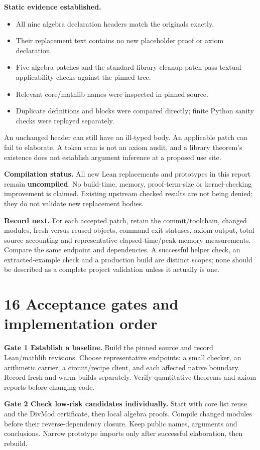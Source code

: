 \documentclass[11pt,letterpaper]{article}
\newcommand{\pageheading}[1]{\newpage\section*{#1}}
\begin{document}
\textbf{Static evidence established.}
\begin{itemize}
\item All nine algebra declaration headers match the originals exactly.
\item Their replacement text contains no new placeholder proof or axiom declaration.
\item Five algebra patches and the standard-library cleanup patch pass textual applicability checks against the pinned tree.
\item Relevant core/mathlib names were inspected in pinned source.
\item Duplicate definitions and blocks were compared directly; finite Python sanity checks were replayed separately.
\end{itemize}
An unchanged header can still have an ill-typed body. An applicable patch can fail to elaborate. A token scan is not an axiom audit, and a library theorem's existence does not establish argument inference at a proposed use site.

\textbf{Compilation status.} All new Lean replacements and prototypes in this report remain \textbf{uncompiled}. No build-time, memory, proof-term-size or kernel-checking improvement is claimed. Existing upstream checked results are not being denied; they do not validate new replacement bodies.

\textbf{Record next.} For each accepted patch, retain the commit/toolchain, changed modules, fresh versus reused objects, command exit statuses, axiom output, total source accounting and representative elapsed-time/peak-memory measurements. Compare the same endpoint and dependencies. A successful helper check, an extracted-example check and a production build are distinct scopes; none should be described as a complete project validation unless it actually is one.

\pageheading{16 Acceptance gates and implementation order}
\textbf{Gate 1 Establish a baseline.} Build the pinned source and record Lean/mathlib revisions. Choose representative endpoints: a small checker, an arithmetic carrier, a circuit/recipe client, and each affected native boundary. Record fresh and warm builds separately. Verify quantitative theorems and axiom reports before changing code.

\textbf{Gate 2 Check low-risk candidates individually.} Start with core list reuse and the DivMod certificate, then local algebra proofs. Compile changed modules before their reverse-dependency closure. Keep public names, arguments and conclusions. Narrow prototype imports only after successful elaboration, then rebuild.
\end{document}
